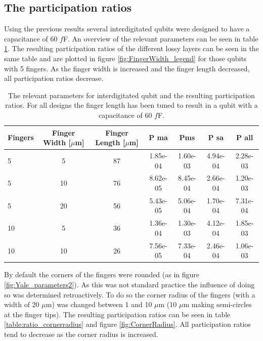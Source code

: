 \subsection{The participation ratios}
Using the previous results several interdigitated qubits were designed to have a capacitance of 60 \(f\)F. An overview of the relevant parameters can be seen in table \ref{table:60fF_fingerlength}. The resulting participation ratios of the different lossy layers can be seen in the same table and are plotted in figure \ref{fig:FingerWidth_legend} for those qubits with 5 fingers. As the finger width is increased and the finger length decreased, all participation ratios decrease.

\begin{table}
	\begin{center}
		\begin{tabular}{ | l || c | c || c | c | c | c |}
			\hline
			Fingers  & Finger Width [\(\mu\)m] & Finger Length [\(\mu\)m]  & P ma &  Pms & P sa & P all \\ \hline
			5 & 5 & 87 & 1.85e-04 & 1.60e-03 & 4.94e-04 & 2.28e-03 \\  
			5 & 10 & 76 & 8.62e-05 & 8.45e-04 & 2.66e-04 & 1.20e-03 \\
			5 & 20 & 56 & 5.43e-05 & 5.06e-04 & 1.70e-04 & 7.31e-04  \\
			10 & 5 & 36 & 1.36e-04 & 1.30e-03 & 4.12e-04 & 1.85e-03 \\
			10 & 10 & 26 & 7.56e-05 & 7.33e-04 & 2.46e-04 & 1.06e-03 \\
			\hline
		\end{tabular}
	\end{center}
	\caption{The relevant parameters for interdigitated qubit and the resulting participation ratios. For all designs the finger length has been tuned to result in a qubit with a capacitance of 60 \(f\)F. }
	\label{table:60fF_fingerlength}
\end{table}



By default the corners of the fingers were rounded (as in figure \ref{fig:Yale_parameters2}). As this was not standard practice the influence of doing so was determined retroactively. To do so the corner radius of the fingers (with a width of 20 \(\mu\)m) was changed between 1 and 10 \(\mu\)m (10 \(\mu\)m making semi-circles at the finger tips). The resulting participation ratios can be seen in table \ref{table:ratio_cornerradius} and figure \ref{fig:CornerRadius}. All participation ratios tend to decrease as the corner radius is increased. 

